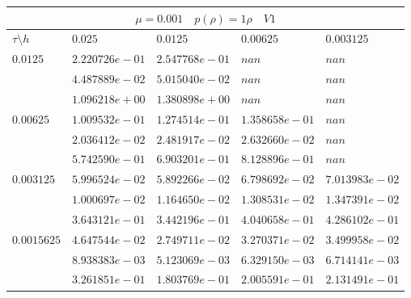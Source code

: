 \documentclass[a4paper,12pt]{extarticle}
\begin{document}
\begin{tabular}{|l|l|l|l|l|}
	\hline
	\multicolumn{5}{|c|}{$\mu =0.001 \quad  p(\rho) =1 \rho \quad V1$}\\
	\hline
	$\tau\setminus h$ & $0.025$ & $0.0125$ & $0.00625$ & $0.003125$\\
	\hline
	$0.0125$  & $2.220726e-01$ & $2.547768e-01$ & $nan$ & $nan$\\
	& $4.487889e-02$ & $5.015040e-02$ & $nan$ & $nan$\\
	& $1.096218e+00$ & $1.380898e+00$ & $nan$ & $nan$\\
	\hline
	$0.00625$  & $1.009532e-01$ & $1.274514e-01$ & $1.358658e-01$ & $nan$\\
	& $2.036412e-02$ & $2.481917e-02$ & $2.632660e-02$ & $nan$\\
	& $5.742590e-01$ & $6.903201e-01$ & $8.128896e-01$ & $nan$\\
	\hline
	$0.003125$  & $5.996524e-02$ & $5.892266e-02$ & $6.798692e-02$ & $7.013983e-02$\\
	& $1.000697e-02$ & $1.164650e-02$ & $1.308531e-02$ & $1.347391e-02$\\
	& $3.643121e-01$ & $3.442196e-01$ & $4.040658e-01$ & $4.286102e-01$\\
	\hline
	$0.0015625$  & $4.647544e-02$ & $2.749711e-02$ & $3.270371e-02$ & $3.499958e-02$\\
	& $8.938383e-03$ & $5.123069e-03$ & $6.329150e-03$ & $6.714141e-03$\\
	& $3.261851e-01$ & $1.803769e-01$ & $2.005591e-01$ & $2.131491e-01$\\
	\hline
\end{tabular}
\end{document}
